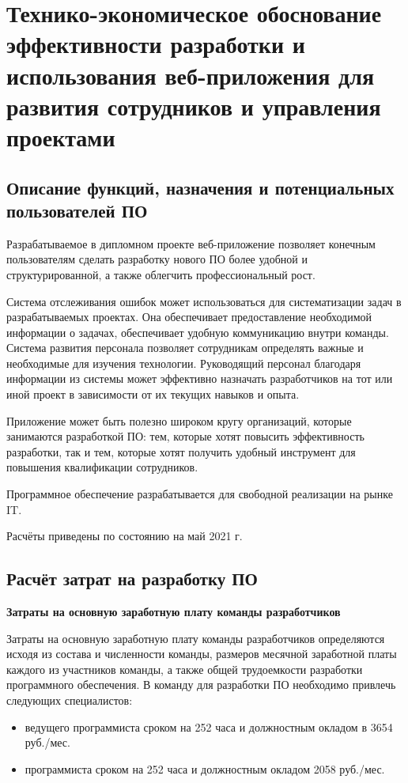 \section{Технико-экономическое обоснование эффективности разработки и использования веб-приложения для развития сотрудников и управления проектами}\label{sec:economics}

\subsection{Описание функций, назначения и потенциальных пользователей ПО}

Разрабатываемое в дипломном проекте веб-приложение позволяет конечным пользователям сделать разработку нового ПО более удобной и структурированной, а также облегчить профессиональный рост. 

Система отслеживания ошибок может использоваться для систематизации задач в разрабатываемых проектах. Она обеспечивает предоставление необходимой информации о задачах, обеспечивает удобную коммуникацию внутри команды. Система развития персонала позволяет сотрудникам определять важные и необходимые для изучения технологии. Руководящий персонал благодаря информации из системы может эффективно назначать разработчиков на тот или иной проект в зависимости от их текущих навыков и опыта.

Приложение может быть полезно широком кругу организаций, которые занимаются разработкой ПО: тем, которые хотят повысить эффективность разработки, так и тем, которые хотят получить удобный инструмент для повышения квалификации сотрудников.

Программное обеспечение разрабатывается для свободной реализации на рынке IT.

Расчёты приведены по состоянию на май 2021 г.

\subsection{Расчёт затрат на разработку ПО}

\textbf{Затраты на основную заработную плату команды разработчиков}

Затраты на основную заработную плату команды разработчиков определяются исходя из состава и численности команды, размеров месячной заработной платы каждого из участников команды, а также общей трудоемкости разработки программного обеспечения. В команду для разработки ПО необходимо привлечь следующих специалистов:
\begin{itemize}
    \item ведущего программиста сроком на 252 часа и должностным окладом в 3654 руб./мес.
    \item программиста сроком на 252 часа и должностным окладом 2058 руб./мес.
\end{itemize}

